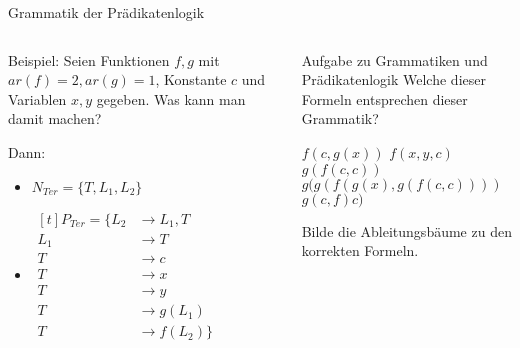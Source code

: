 \documentclass[handout]{beamer}
\begin{document}
\begin{frame}{Grammatik der Prädikatenlogik}
	
	
	\begin{columns}
		\begin{column}{0.6\textwidth}
			Beispiel: Seien Funktionen $f,g$ mit $ar(f) = 2, ar(g) = 1$, Konstante $c$ und Variablen $x,y$ gegeben. Was kann man damit machen?\vspace{.2cm}
			
			\bp
			
			Dann: 
			\begin{itemize}
				\item $N_{Ter}=\{ T, L_1, L_2 \}$
				\item $\begin{aligned}[t]
				P_{Ter} = \{  L_2 & \to L_1 , T \\%
				L_1 & \to T  \\
				T   & \to c \\
				T   & \to x \\
				T   & \to y \\
				T   & \to g ( L_1 ) \\
				T   & \to f ( L_2 ) \}
				\end{aligned}
				$
			\end{itemize}
		\end{column}
		
		\begin{column}{0.4\textwidth}
			\bp
			
			\begin{taskblock}{Aufgabe zu Grammatiken und Prädikatenlogik}
				Welche dieser Formeln entsprechen dieser Grammatik?
				\vspace{.2cm}
				\begin{itemize}
					\pitem $f(c, g(x))$
					\pitem $f(x, y, c)$
					\pitem $g(f(c, c))$
					\pitem $g(g(f(g(x), g(f(c, c))))$
					\pitem $g(c, f)c)$
				\end{itemize}
			
				\ip Bilde die Ableitungsbäume zu den korrekten Formeln.
			\end{taskblock}
		\end{column}
	\end{columns}
\end{frame}
\end{document}
